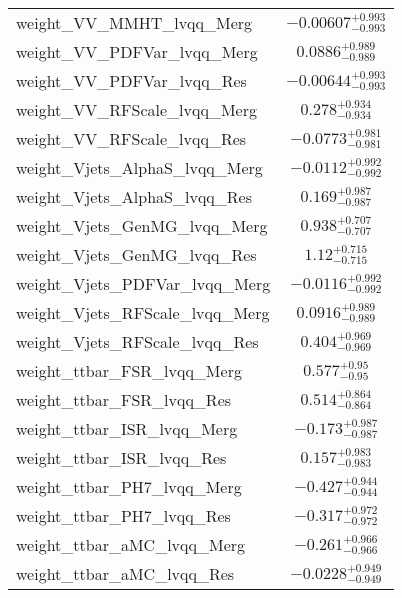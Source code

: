 \begin{tabular}{|l|c|}
weight\_VV\_MMHT\_lvqq\_Merg & $-0.00607^{+0.993}_{-0.993}$ \\
weight\_VV\_PDFVar\_lvqq\_Merg & $0.0886^{+0.989}_{-0.989}$ \\
weight\_VV\_PDFVar\_lvqq\_Res & $-0.00644^{+0.993}_{-0.993}$ \\
weight\_VV\_RFScale\_lvqq\_Merg & $0.278^{+0.934}_{-0.934}$ \\
weight\_VV\_RFScale\_lvqq\_Res & $-0.0773^{+0.981}_{-0.981}$ \\
weight\_Vjets\_AlphaS\_lvqq\_Merg & $-0.0112^{+0.992}_{-0.992}$ \\
weight\_Vjets\_AlphaS\_lvqq\_Res & $0.169^{+0.987}_{-0.987}$ \\
weight\_Vjets\_GenMG\_lvqq\_Merg & $0.938^{+0.707}_{-0.707}$ \\
weight\_Vjets\_GenMG\_lvqq\_Res & $1.12^{+0.715}_{-0.715}$ \\
weight\_Vjets\_PDFVar\_lvqq\_Merg & $-0.0116^{+0.992}_{-0.992}$ \\
weight\_Vjets\_RFScale\_lvqq\_Merg & $0.0916^{+0.989}_{-0.989}$ \\
weight\_Vjets\_RFScale\_lvqq\_Res & $0.404^{+0.969}_{-0.969}$ \\
weight\_ttbar\_FSR\_lvqq\_Merg & $0.577^{+0.95}_{-0.95}$ \\
weight\_ttbar\_FSR\_lvqq\_Res & $0.514^{+0.864}_{-0.864}$ \\
weight\_ttbar\_ISR\_lvqq\_Merg & $-0.173^{+0.987}_{-0.987}$ \\
weight\_ttbar\_ISR\_lvqq\_Res & $0.157^{+0.983}_{-0.983}$ \\
weight\_ttbar\_PH7\_lvqq\_Merg & $-0.427^{+0.944}_{-0.944}$ \\
weight\_ttbar\_PH7\_lvqq\_Res & $-0.317^{+0.972}_{-0.972}$ \\
weight\_ttbar\_aMC\_lvqq\_Merg & $-0.261^{+0.966}_{-0.966}$ \\
weight\_ttbar\_aMC\_lvqq\_Res & $-0.0228^{+0.949}_{-0.949}$ \\
\hline
\end{tabular}

